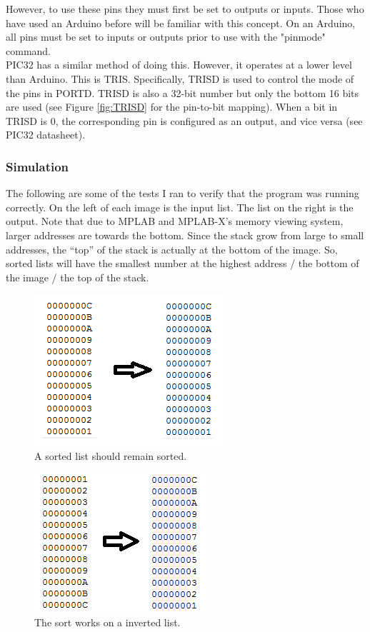 \documentclass[11pt]{article}
\begin{document}
However, to use these pins they must first be set to outputs or inputs. Those who have used an Arduino before will be familiar with this concept. On an Arduino, all pins must be set to inputs or outputs prior to use with the "pinmode" command. \\

PIC32 has a similar method of doing this. However, it operates at a lower level than Arduino. This is TRIS. Specifically, TRISD is used to control the mode of the pins in PORTD. TRISD is also a 32-bit number but only the bottom 16 bits are used (see Figure \ref{fig:TRISD} for the pin-to-bit mapping). When a bit in TRISD is 0, the corresponding pin is configured as an output, and vice versa (see PIC32 datasheet). 
 


\clearpage


\subsubsection{Simulation}

The following are some of the tests I ran to verify that the program was running correctly. On the left of each image is the input list. The list on the right is the output. Note that due to MPLAB and MPLAB-X's memory viewing system, larger addresses are towards the bottom. Since the stack grow from large to small addresses, the \enquote{top} of the stack is actually at the bottom of the image. So, sorted lists will have the smallest number at the highest address / the bottom of the image / the top of the stack.

\begin{figure}[h!]
\centering
\includegraphics[scale=0.9]{sort1.png}
\caption{A sorted list should remain sorted.}
\label{fig:sort1}
\end{figure} 

\begin{figure}[h!]
\centering
\includegraphics[scale=0.9]{sort2.png}
\caption{The sort works on a inverted list.}
\label{fig:sort2}
\end{figure} 
\end{document}
